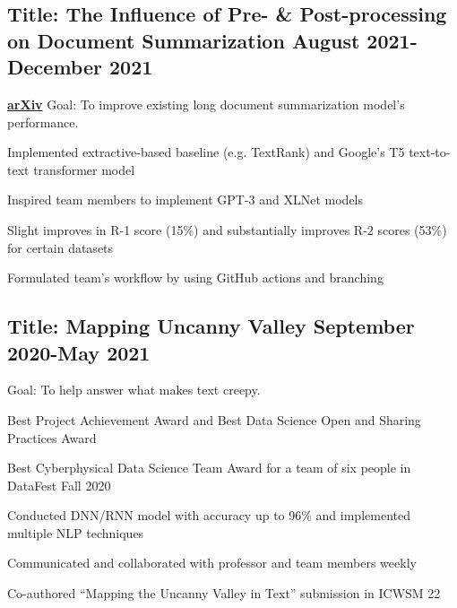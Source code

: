 \documentclass[11pt]{article}
\begin{document}
\subsection*{Title: The Influence of Pre- \& Post-processing on Document Summarization \hfill {\normalfont August 
		2021-December 2021}}
\noindent
\href{https://github.com/Anthonyive/csci-544-project.git}{}  \href{https://www.youtube.com/watch?v=oVIVtOPeWEs}{} \href{https://arxiv.org/abs/2112.01660}{\textbf{arXiv}} Goal: To improve existing long document summarization model's performance.
\begin{compactitem}
	\item Implemented extractive-based baseline (e.g. TextRank) and Google's T5 text-to-text transformer model
	\item Inspired team members to implement GPT-3 and XLNet models
	\item Slight improves in R-1 score (15\%) and substantially improves R-2 scores (53\%) for certain datasets
	\item Formulated team's workflow by using GitHub actions and branching
\end{compactitem}
\vspace{0.1in}

\subsection*{Title: Mapping Uncanny Valley \hfill {\normalfont September 
2020-May 2021}}
\noindent
\href{https://github.com/Anthonyive/Research-Mapping-Uncanny-Valley.git}{} Goal: To help answer what makes text creepy.
\begin{compactitem}
    \item Best Project Achievement Award and Best Data Science Open and 
        Sharing Practices Award
    \item Best Cyberphysical Data Science Team Award for a team of six people 
        in DataFest Fall 2020
    \item Conducted DNN/RNN model with accuracy up to 96\% and implemented 
        multiple NLP techniques
    \item Communicated and collaborated with professor and team members weekly
    \item Co-authored ``Mapping the Uncanny Valley in Text'' submission in 
        ICWSM 22
\end{compactitem}
\vspace{0.1in}
\end{document}
